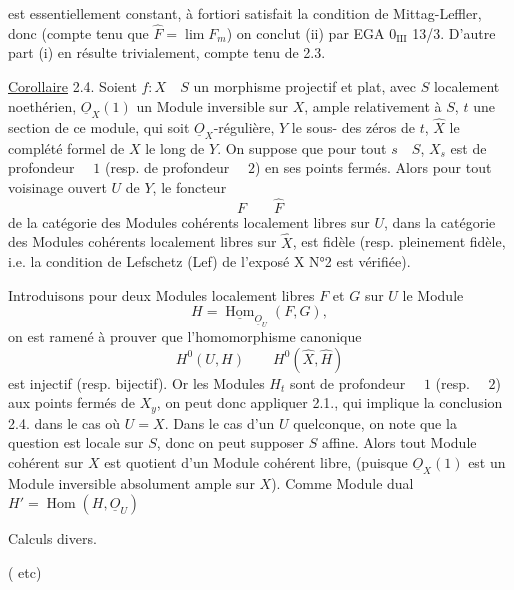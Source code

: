 est essentiellement constant,  à fortiori satisfait la condition de Mittag-Leffler, donc (compte tenu que $\widehat F=\lim F_m$) on conclut (ii) par EGA $0_{\mathrm{III}}$ 13/3. D'autre part (i) en résulte trivialement, compte tenu de 2.3.

\uline{Corollaire} 2.4. Soient $f:X\quad S$ un morphisme projectif et plat, avec $S$ localement noethérien, $\underline O_X(1)$ un Module inversible sur $X$, ample relativement à $S$, $t$ une section de ce module, qui soit $\underline O_X$-régulière, $Y$  le sous- des zéros de $t$, $\widehat X$ le complété formel de $X$ le long de $Y$. On suppose que pour tout $s\quad S$, $X_s$ est de profondeur $\quad1$ (resp. de profondeur $\quad2$) en ses points fermés. Alors pour tout voisinage ouvert $U$ de $Y$, le foncteur
\[
F\qquad\widehat F
\]
de la catégorie des Modules cohérents localement libres sur $U$, dans la catégorie des Modules cohérents localement libres sur $\widehat X$, est fidèle (resp. pleinement fidèle, i.e. la condition  de Lefschetz (Lef) de l'exposé X N°2 est vérifiée).

Introduisons  pour deux Modules localement libres $F$ et $G$ sur $U$ le Module
\[
H=\underline{\operatorname{Hom}}_{\underline O_U}(F,G),
\]
on est ramené à prouver que l'homomorphisme canonique
\[
H^0(U,H)\qquad H^0(\widehat X,\widehat H)
\]
est injectif (resp. bijectif). Or les Modules $H_t$ sont de profondeur $\quad1$ (resp. $\quad2$) aux points fermés de $X_y$, on peut donc appliquer 2.1., qui implique la conclusion 2.4. dans le cas où $U=X$. Dans le cas d'un $U$ quelconque, on note que la question est locale sur $S$, donc on peut supposer $S$ affine. Alors tout Module cohérent sur $X$ est quotient d'un Module cohérent  libre, (puisque $\underline O_X(1)$ est un Module inversible absolument ample sur $X$). Comme  Module dual $H'=\operatorname{Hom}(H,\underline O_U)$


Calculs divers.

(  etc)



